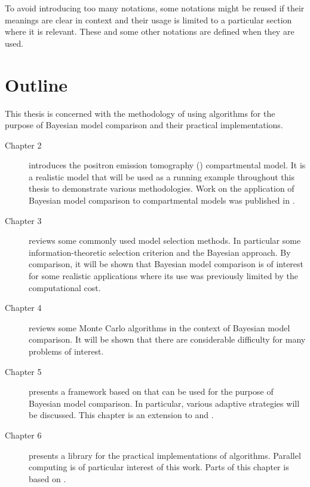 To avoid introducing too many notations, some notations might be reused if
their meanings are clear in context and their usage is limited to a
particular section where it is relevant. These and some other notations are
defined when they are used.

\section{Outline}
\label{sec:Outline}

This thesis is concerned with the methodology of using \smc algorithms for the
purpose of Bayesian model comparison and their practical implementations.
\begin{description}
  \item[Chapter 2] introduces the positron emission tomography (\pet)
  compartmental model. It is a realistic model that will be used as a running
  example throughout this thesis to demonstrate various methodologies. Work
  on the application of Bayesian model comparison to \pet compartmental
  models was published in \cite{Zhou2013}.
  \item[Chapter 3] reviews some commonly used model selection methods. In
  particular some information-theoretic selection criterion and the Bayesian
  approach. By comparison, it will be shown that Bayesian model comparison is
  of interest for some realistic applications where its use was previously
  limited by the computational cost.
  \item[Chapter 4] reviews some Monte Carlo algorithms in the context of
  Bayesian model comparison. It will be shown that there are considerable
  difficulty for many problems of interest.
  \item[Chapter 5] presents a framework based on \smc that can be used for
  the purpose of Bayesian model comparison. In particular, various adaptive
  strategies will be discussed. This chapter is an extension to
  \cite{Zhou:2012uz} and \cite{Zhou:2013vx}.  
  \item[Chapter 6] presents a \cpp library for the practical implementations
  of \smc algorithms. Parallel computing is of particular interest of this
  work. Parts of this chapter is based on \cite{vsmcjss}.
\end{description}
